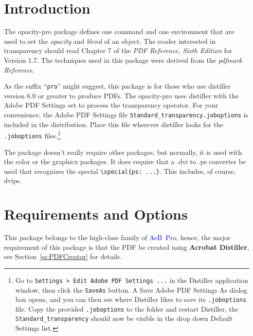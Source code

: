 \documentclass{article}
\let\pkg\textsf
\begin{document}
\maketitle

\tableofcontents
{}



\section{Introduction}

The \pkg{opacity-pro} package defines one command and one environment that are
used to set the \emph{opacity} and \emph{blend} of an object. The reader interested in
transparency should read Chapter 7 of the \textsl{PDF Reference, Sixth
Edition} for Version 1.7. The techniques used in this package were derived
from the \textsl{pdfmark Reference}.

As the suffix ``\texttt{pro}'' might suggest, this package is for
those who use distiller version 6.0 or greater to produce PDFs. The
\textsf{opacity-pro} uses distiller with the \textsf{Adobe PDF
Settings} set to process the transparency operator. For your
convenience, the \textsf{Adobe PDF Settings} file
\texttt{Standard\_transparency.joboptions} is included in the
distribution. Place this file wherever distiller looks for the
\texttt{.joboptions} files.\footnote{Go to \texttt{Settings > Edit
Adobe PDF Settings ...} in the Distiller application window, then
click the \texttt{SaveAs} button. A \textsf{Save Adobe PDF Settings
As} dialog box opens, and you can then see where Distiller likes to
save its \texttt{.joboptions} file. Copy the provided
\texttt{.joboptions} to the folder and restart Distiller, the
\texttt{Standard\_transparency} should now be visible in the drop
down \textsf{Default Settings} list.}

The package doesn't really require other packages, but normally, it
is used with the color or the graphicx packages. It does require
that a .dvi to .ps converter be used that recognizes the special
\verb!\special{ps: ...}!.  This includes, of course,
\textsf{dvips}.

\section{Requirements and Options}

This package belongs to the high-class family of \textsf{\textcolor{blue}{AeB~Pro}}, hence,
the major requirement of this package is that the PDF be created using \textbf{Acrobat Distiller},
see Section~\ref*{ss:PDFCreator} for details.
\end{document}
